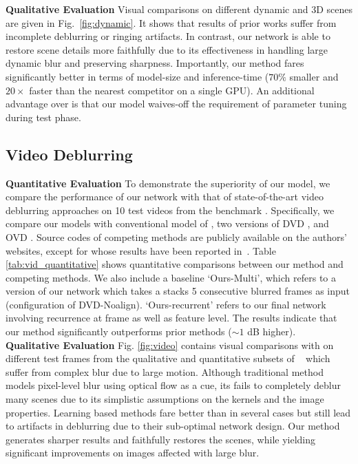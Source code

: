 \documentclass[10pt,twocolumn,letterpaper]{article}
\begin{document}
\noindent \textbf{Qualitative Evaluation}
Visual comparisons on different dynamic and 3D scenes are given in Fig.~\ref{fig:dynamic}. It shows that results of prior works suffer from incomplete deblurring or ringing artifacts. In contrast, our network is able to restore scene details more faithfully due to its effectiveness in handling large dynamic blur and preserving sharpness. Importantly, our method fares significantly better in terms of model-size and inference-time ($70\%$ smaller and $20\times$ faster than the nearest competitor \cite{tao2018scale} on a single GPU). An additional advantage over \cite{xu2013unnatural,whyte2012non} is that our model waives-off the requirement of parameter tuning during test phase.



\subsection{Video Deblurring}

\noindent \textbf{Quantitative Evaluation}
To demonstrate the superiority of our model, we compare  the  performance of our network with that of state-of-the-art video deblurring approaches on 10 test videos from the benchmark \cite{su2017deep}. Specifically, we  compare  our  models with conventional model of \cite{delbracio2015hand}, two versions of DVD \cite{su2017deep}, and OVD \cite{hyun2017online}. Source codes of competing methods are publicly available on the authors' websites, except for \cite{delbracio2015hand} whose results have been reported in~\cite{su2017deep}. Table \ref{tab:vid_quantitative} shows quantitative comparisons between our method and competing methods. We also include a baseline `Ours-Multi', which refers to a version of our network which takes a stacks 5 consecutive blurred frames as input (configuration of DVD-Noalign). `Ours-recurrent' refers to our final network involving recurrence at frame as well as feature level. The results indicate that our method significantly outperforms prior methods ($\sim 1$ dB higher).
\\
\textbf{Qualitative Evaluation}
Fig. \ref{fig:video} contains visual comparisons with \cite{hyun2015generalized,su2017deep,hyun2017online} on different test frames from the qualitative and quantitative subsets of ~\cite{su2017deep} which suffer from complex blur due to large motion. Although traditional method \cite{hyun2015generalized} models pixel-level blur using optical flow as a cue, its fails to completely deblur many scenes due to its simplistic assumptions on the kernels and the image properties. Learning based methods \cite{su2017deep,hyun2017online} fare better than \cite{hyun2015generalized} in several cases but still lead to artifacts in deblurring due to their sub-optimal network design. Our method generates sharper results and faithfully restores the scenes, while yielding significant improvements on images affected with large blur.
\end{document}
